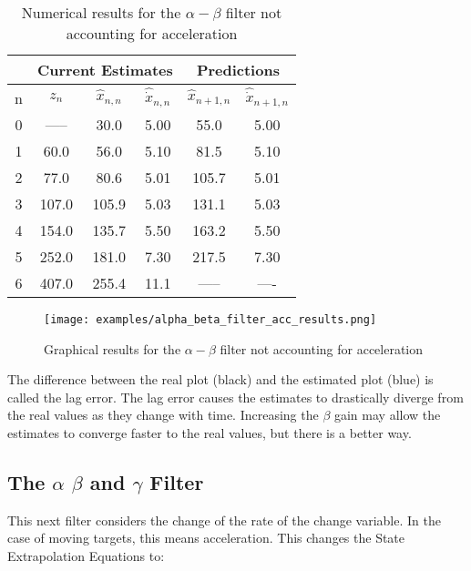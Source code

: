         \begin{table}[h!]
            \begin{tabular}{c | c | c | c | c | c}
            \toprule
            & \multicolumn{3}{|c|}{Current Estimates} & \multicolumn{2}{c}{Predictions} \\
            \midrule
            n & $z_n$ & $\hat{x}_{n,n}$ & $ \hat{\dot{x}}_{n,n} $ & $ \hat{x}_{n+1,n}$ & $ \hat{\dot{x}}_{n+1,n} $ \\
            \midrule

            0  & ----- & 30.0  & 5.00 & 55.0  & 5.00 \\
            1  & 60.0  & 56.0  & 5.10 & 81.5  & 5.10 \\
            2  & 77.0  & 80.6  & 5.01 & 105.7 & 5.01 \\
            3  & 107.0 & 105.9 & 5.03 & 131.1 & 5.03 \\
            4  & 154.0 & 135.7 & 5.50 & 163.2 & 5.50 \\
            5  & 252.0 & 181.0 & 7.30 & 217.5 & 7.30 \\
            6  & 407.0 & 255.4 & 11.1 & ----- & ---- \\

            \bottomrule
            \end{tabular}
            \caption[Alpha-Beta Filter with Lag]{Numerical results for the $\alpha-\beta$ filter not accounting for acceleration}
        \end{table}

        \begin{figure}[h!]
            \texttt{[image: examples/alpha\_beta\_filter\_acc\_results.png]}
            \caption[Alpha-Beta Filter Results with Lag]{Graphical results for the $\alpha-\beta$ filter not accounting for acceleration}
        \end{figure}

        The difference between the real plot (black) and the estimated plot (blue) is called the lag error.
        The lag error causes the estimates to drastically diverge from the real values as they change with time.
        Increasing the $\beta$ gain may allow the estimates to converge faster to the real values, but there is a better way.

        \subsection{The $\alpha$ $\beta$ and $\gamma$ Filter}
        This next filter considers the change of the rate of the change variable. 
        In the case of moving targets, this means acceleration.
        This changes the State Extrapolation Equations to:

